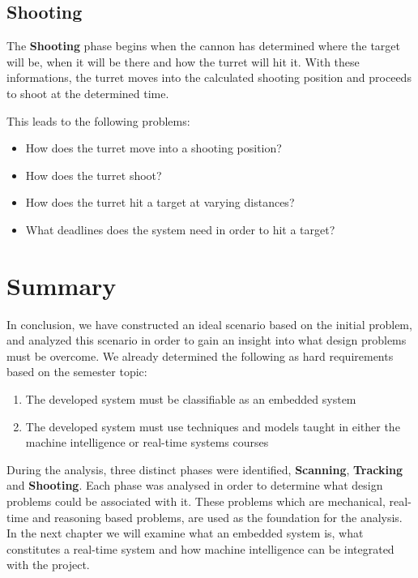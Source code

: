 \subsection{Shooting}
The \textbf{Shooting} phase begins when the cannon has determined where the
target will be, when it will be there and how the turret will hit it. With
these informations, the turret moves into the calculated shooting position and
proceeds to shoot at the determined time.\nl

This leads to the following problems:
\begin{itemize}
  \item How does the turret move into a shooting position?
  \item How does the turret shoot?
  \item How does the turret hit a target at varying distances?
  \item What deadlines does the system need in order to hit a target?
\end{itemize}

\section{Summary}
In conclusion, we have constructed an ideal scenario based on the initial
problem, and analyzed this scenario in order to gain an insight into what
design problems must be overcome. We already determined the following as hard
requirements based on the semester topic:

\begin{enumerate}
	\item The developed system must be classifiable as an embedded system
	\item The developed system must use techniques and models taught in either the
	machine intelligence or real-time systems courses
\end{enumerate}

During the analysis, three distinct phases were identified, \textbf{Scanning},
\textbf{Tracking} and \textbf{Shooting}. Each phase was analysed in order to
determine what design problems could be associated with it. These problems
which are mechanical, real-time and reasoning based problems, are used as the
foundation for the analysis. In the next chapter we will examine what an
embedded system is, what constitutes a real-time system and how machine
intelligence can be integrated with the project.
